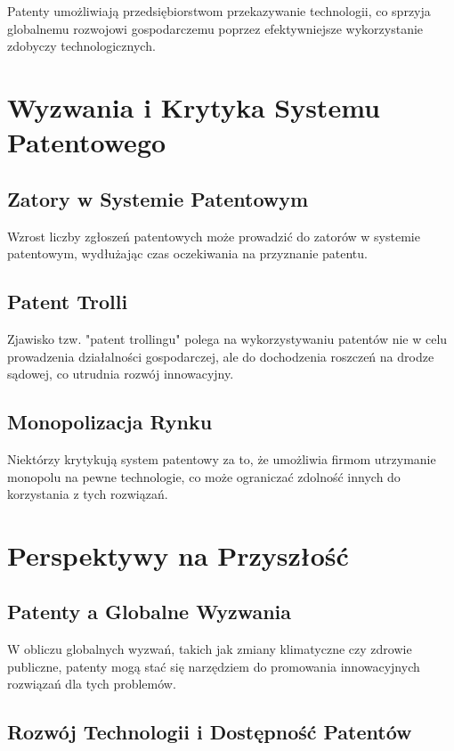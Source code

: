 \documentclass[12pt, letterpaper]{article}
\begin{document}
Patenty umożliwiają przedsiębiorstwom przekazywanie technologii, co sprzyja globalnemu rozwojowi gospodarczemu poprzez efektywniejsze wykorzystanie zdobyczy technologicznych.

\section{Wyzwania i Krytyka Systemu Patentowego}

\subsection{Zatory w Systemie Patentowym}

Wzrost liczby zgłoszeń patentowych może prowadzić do zatorów w systemie patentowym, wydłużając czas oczekiwania na przyznanie patentu.

\subsection{Patent Trolli}

Zjawisko tzw. "patent trollingu" polega na wykorzystywaniu patentów nie w celu prowadzenia działalności gospodarczej, ale do dochodzenia roszczeń na drodze sądowej, co utrudnia rozwój innowacyjny.

\subsection{Monopolizacja Rynku}

Niektórzy krytykują system patentowy za to, że umożliwia firmom utrzymanie monopolu na pewne technologie, co może ograniczać zdolność innych do korzystania z tych rozwiązań.

\section{Perspektywy na Przyszłość}

\subsection{Patenty a Globalne Wyzwania}

W obliczu globalnych wyzwań, takich jak zmiany klimatyczne czy zdrowie publiczne, patenty mogą stać się narzędziem do promowania innowacyjnych rozwiązań dla tych problemów.

\subsection{Rozwój Technologii i Dostępność Patentów}
\end{document}
